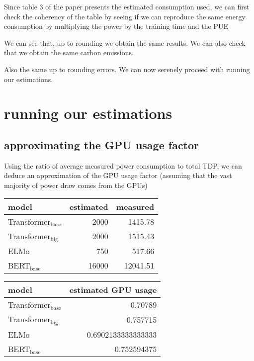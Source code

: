 \documentclass[11pt]{article}
\begin{document}
Since table 3 of the paper presents the estimated consumption used, we can first
check the coherency of the table by seeing if we can reproduce the
same energy consumption by multiplying the power by the training time
and the \gls{PUE}

We can see that, up to rounding we obtain the same results.
We can also check that we obtain the same carbon emissions.

Also the same up to rounding errors. We can now serenely proceed with
running our estimations.

\section{running our estimations}
\label{sec:org67db772}

\subsection{approximating the GPU usage factor}
\label{sec:orga72c0d2}

Using the ratio of average measured power consumption to total TDP, we
can deduce an approximation of the GPU usage factor (assuming that the
vast majority of power draw comes from the GPUs)

\begin{center}
\begin{tabular}{lrr}
model & estimated & measured\\
\hline
Transformer\(_{\text{base}}\) & 2000 & 1415.78\\
Transformer\(_{\text{big}}\) & 2000 & 1515.43\\
ELMo & 750 & 517.66\\
BERT\(_{\text{base}}\) & 16000 & 12041.51\\
\end{tabular}
\end{center}

\begin{center}
\begin{tabular}{lr}
model & estimated GPU usage\\
\hline
Transformer\(_{\text{base}}\) & 0.70789\\
Transformer\(_{\text{big}}\) & 0.757715\\
ELMo & 0.6902133333333333\\
BERT\(_{\text{base}}\) & 0.752594375\\
\end{tabular}
\end{center}
\end{document}
